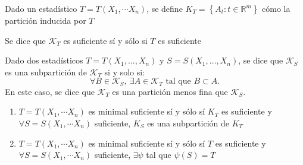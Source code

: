   \begin{definición}
    Dado un estadístico $T=T\left(X_{1}, \cdots X_{n}\right)$, se define $K_{T}=\left\{A_{t}: t \in \mathbb{R}^{m}\right\}$ cómo la partición inducida por $T$\\
  \end{definición}


  \begin{proposición}
    Se dice que $\mathcal{K}_{T}$ es suficiente sí y sólo si $T$ es suficiente\\
  \end{proposición}

  \begin{proposición}
    Dado dos estadísticos $T = T(X_1, \dots, X_n)$ y $S = S(X_1, \dots, X_n)$, se dice que $\mathcal{K}_S$ es una subpartición de $\mathcal{K}_T$ si y solo si:  
    $$ \forall B \in \mathcal{K}_S, \ \exists A \in \mathcal{K}_T \text{ tal que } B \subset A.$$
    En este caso, se dice que $\mathcal{K}_T$ es una partición menos fina que $\mathcal{K}_S$.
  \end{proposición}
  
  \begin{definición}
  \vspace{-\baselineskip}
  \vspace{-\baselineskip}
  \begin{enumerate}
    \item $T=T\left(X_{1}, \cdots X_{n}\right)$ es minimal suficiente sí y sólo sí $K_{T}$ es suficiente y $\forall S=S\left(X_{1}, \cdots X_{n}\right)$ suficiente, $K_{S}$ es una subpartición de $K_{T}$\\
    \item $T=T\left(X_{1}, \cdots X_{n}\right)$ es minimal suficiente sí y sólo sí $T$ es suficiente y $\forall S=S\left(X_{1}, \cdots X_{n}\right)$ suficiente, $\exists \psi$ tal que $\psi(S)=T$
  \end{enumerate}
  \end{definición}
  
